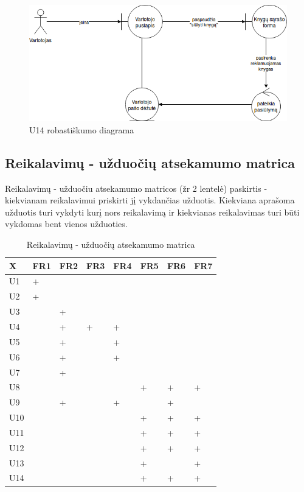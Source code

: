 \documentclass{VUMIFPSkursinis}
\begin{document}
\begin{enumerate}[label=\textbf{U\arabic*.}]
\begin{figure}[H]
					\centering
					\includegraphics[scale=0.6]{img/U14.png}
					\caption{U14 robastiškumo diagrama}
					\label{img:psi2-u14-robustness}
				\end{figure}
		\end{enumerate}

	\subsection{Reikalavimų - užduočių atsekamumo matrica}\label{strukturinisDSModelis_matrica}
		Reikalavimų - užduočiu atsekamumo matricos (žr 2 lentelė) paskirtis - kiekvianam reikalavimui
		priskirti jį vykdančias užduotis. Kiekviana aprašoma užduotis turi vykdyti kurį nors reikalavimą ir
		kiekvianas reikalavimas turi būti vykdomas bent vienos užduoties.
\begin{table}[H]\footnotesize
  \centering
  \caption{Reikalavimų - užduočių atsekamumo matrica}
  \resizebox{\textwidth}{!}
  {\begin{tabular}{|l| l| l| l| l| l| l| l|} \hline
    	X		& FR1		& FR2		& FR3		& FR4		& FR5		& FR6		& FR7\\
\hline
	U1		&+		&		&		&		&		&		&\\
\hline
	U2		&+		&		&		&		&		&		&\\
\hline
	U3		&		&+		&		&		&		&		&\\
\hline
	U4		&		&+		&+		&+		&		&		&\\
\hline
	U5		&		&+		&		&+		&		&		&\\
\hline
	U6		&		&+		&		&+		&		&		&\\
\hline
	U7		&		&+		&		&		&		&		&\\
\hline
	U8		&		&		&		&		&+		&+		&+\\
\hline
	U9		&		&+		&		&+		&		&+		&\\
\hline
	U10		&		&		&		&		&+		&+		&+\\
\hline
	U11		&		&		&		&		&+		&+		&+\\
\hline
	U12		&		&		&		&		&+		&+		&+\\
\hline
	U13		&		&		&		&		&+		&		&+\\
\hline
	U14		&		&		&		&		&+		&+		&+\\
\hline
  \end{tabular}}
  \label{tab:table example}
\end{table}
\end{document}
